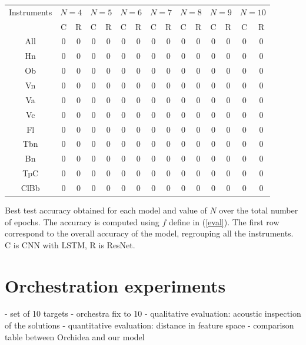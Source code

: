 \documentclass{article}
\begin{document}
\begin{table}
\begin{tabular}{|c|c|c|c|c|c|c|c|c|c|c|c|c|c|c|}
\hline
Instruments & \multicolumn{2}{c|}{$N=4$} & \multicolumn{2}{c|}{$N=5$}& \multicolumn{2}{c|}{$N=6$}& \multicolumn{2}{c|}{$N=7$}& \multicolumn{2}{c|}{$N=8$}& \multicolumn{2}{c|}{$N=9$}& \multicolumn{2}{c|}{$N=10$}\\
\cline{2-3} & C & R & C & R & C & R & C & R & C & R & C & R & C & R\\
\hline
All & 0 & 0 & 0 & 0 & 0 & 0 & 0 & 0 & 0 & 0 & 0 & 0 & 0 & 0\\
Hn & 0 & 0 & 0 & 0 & 0 & 0 & 0 & 0 & 0 & 0 & 0 & 0 & 0 & 0\\
Ob & 0 & 0 & 0 & 0 & 0 & 0 & 0 & 0 & 0 & 0 & 0 & 0 & 0 & 0\\
Vn & 0 & 0 & 0 & 0 & 0 & 0 & 0 & 0 & 0 & 0 & 0 & 0 & 0 & 0\\
Va & 0 & 0 & 0 & 0 & 0 & 0 & 0 & 0 & 0 & 0 & 0 & 0 & 0 & 0\\
Vc & 0 & 0 & 0 & 0 & 0 & 0 & 0 & 0 & 0 & 0 & 0 & 0 & 0 & 0\\
Fl & 0 & 0 & 0 & 0 & 0 & 0 & 0 & 0 & 0 & 0 & 0 & 0 & 0 & 0\\
Tbn & 0 & 0 & 0 & 0 & 0 & 0 & 0 & 0 & 0 & 0 & 0 & 0 & 0 & 0\\
Bn & 0 & 0 & 0 & 0 & 0 & 0 & 0 & 0 & 0 & 0 & 0 & 0 & 0 & 0\\
TpC & 0 & 0 & 0 & 0 & 0 & 0 & 0 & 0 & 0 & 0 & 0 & 0 & 0 & 0\\
ClBb & 0 & 0 & 0 & 0 & 0 & 0 & 0 & 0 & 0 & 0 & 0 & 0 & 0 & 0\\
\hline
\end{tabular}

\begin{caption}
Best test accuracy obtained for each model and value of $N$ over the total number of epochs. The accuracy is computed using $f$ define in (\ref{eval}). The first row correspond to the overall accuracy of the model, regrouping all the instruments. C is CNN with LSTM, R is ResNet.
\label{class_res}
\end{caption}
\end{table}

\section{Orchestration experiments}
- set of 10 targets
- orchestra fix to 10
- qualitative evaluation: acoustic inspection of the solutions
- quantitative evaluation: distance in feature space
- comparison table between Orchidea and our model
\end{document}
